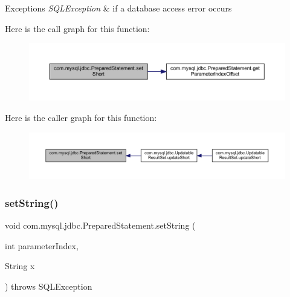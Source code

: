 \begin{DoxyExceptions}{Exceptions}
{\em S\+Q\+L\+Exception} & if a database access error occurs \\
\hline
\end{DoxyExceptions}
Here is the call graph for this function\+:
\nopagebreak
\begin{figure}[H]
\begin{center}
\leavevmode
\includegraphics[width=350pt]{classcom_1_1mysql_1_1jdbc_1_1_prepared_statement_a9ed8cafd89fc66eb155892b62a006c38_cgraph}
\end{center}
\end{figure}
Here is the caller graph for this function\+:
\nopagebreak
\begin{figure}[H]
\begin{center}
\leavevmode
\includegraphics[width=350pt]{classcom_1_1mysql_1_1jdbc_1_1_prepared_statement_a9ed8cafd89fc66eb155892b62a006c38_icgraph}
\end{center}
\end{figure}
\mbox{\label{classcom_1_1mysql_1_1jdbc_1_1_prepared_statement_a0a4c13284de8a0257085966284a41f1d}} 
\subsubsection{\texorpdfstring{set\+String()}{setString()}}
{\footnotesize\ttfamily void com.\+mysql.\+jdbc.\+Prepared\+Statement.\+set\+String (\begin{DoxyParamCaption}\item[{int}]{parameter\+Index,  }\item[{String}]{x }\end{DoxyParamCaption}) throws S\+Q\+L\+Exception}

